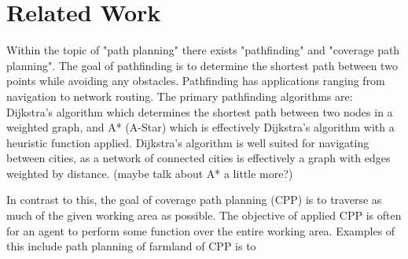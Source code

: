 \chapter{Related Work}\label{related_work}

Within the topic of "path planning" there exists "pathfinding" and "coverage path planning".
The goal of pathfinding is to determine the shortest path between two points while avoiding any obstacles.
Pathfinding has applications ranging from navigation to network routing.
The primary pathfinding algorithms are: Dijkstra's algorithm\cite{Dijkstra, Improved_Dijkstra} which determines the shortest path between two nodes in a weighted graph, and A* (A-Star)\cite{A_Star_lit_review, A_Star_beginners, A_Star_in_computer_games} which is effectively Dijkstra's algorithm with a heuristic function applied.
Dijkstra's algorithm is well suited for navigating between cities\cite{Dijkstra_for_railroads}, as a network of connected cities is effectively a graph with edges weighted by distance.
(maybe talk about A* a little more?)


In contrast to this, the goal of coverage path planning (CPP) is to traverse as much of the given working area as possible.
The objective of applied CPP is often for an agent to perform some function over the entire working area.
Examples of this include path planning of farmland\cite{CPP_3D_farming_terrain, CPP_alg_agriculture}
of CPP is to
